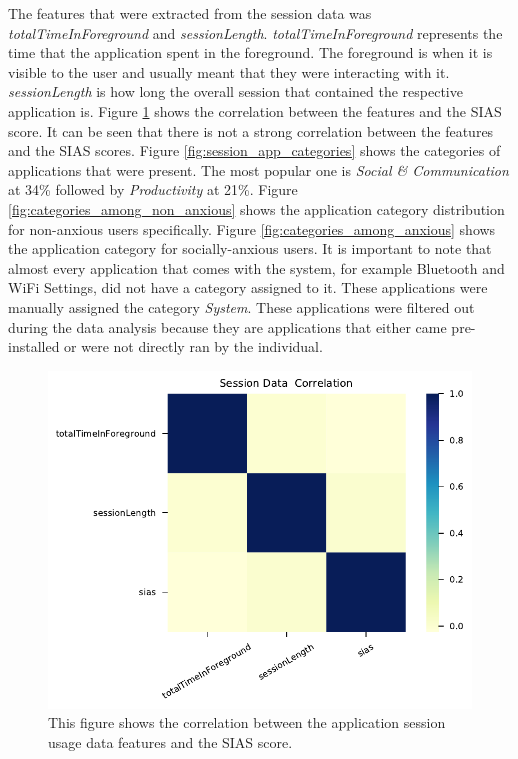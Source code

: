 \documentclass{l4proj}
\begin{document}
The features that were extracted from the session data was \textit{totalTimeInForeground} and \textit{sessionLength}. \textit{totalTimeInForeground} represents the time that the application spent in the foreground. The foreground is when it is visible to the user and usually meant that they were interacting with it. \textit{sessionLength} is how long the overall session that contained the respective application is. Figure \ref{fig:session_feature_correlation} shows the correlation between the features and the SIAS score. It can be seen that there is not a strong correlation between the features and the SIAS scores. Figure \ref{fig:session_app_categories} shows the categories of applications that were present. The most popular one is \textit{Social \& Communication} at \num{34}\% followed by \textit{Productivity} at \num{21}\%. Figure \ref{fig:categories_among_non_anxious} shows the application category distribution for non-anxious users specifically. Figure \ref{fig:categories_among_anxious} shows the application category for socially-anxious users. It is important to note that almost every application that comes with the system, for example Bluetooth and WiFi Settings, did not have a category assigned to it. These applications were manually assigned the category \textit{System}. These applications were filtered out during the data analysis because they are applications that either came pre-installed or were not directly ran by the individual.

\begin{figure}[htb]
    \centering
    \includegraphics[width=0.75\linewidth]{images/sessions/correlation_SessionData.pdf}
    \caption{This figure shows the correlation between the application session usage data features and the SIAS score.}
    \label{fig:session_feature_correlation} 
\end{figure}
\end{document}
